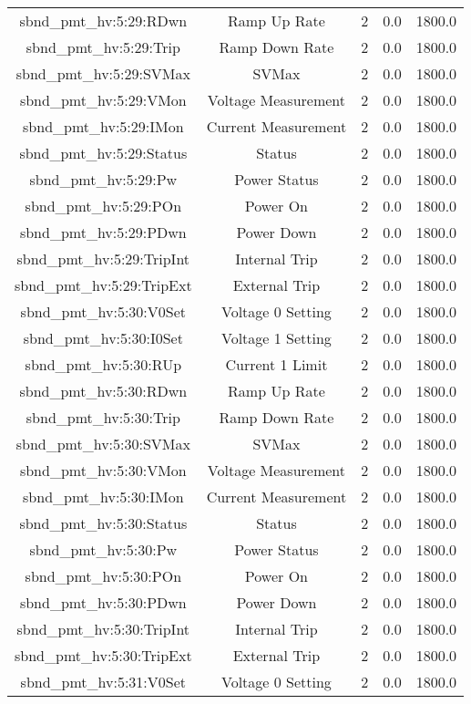 \begin{table}[ptb]
\begin{tabular}{c | c c c c}
sbnd_pmt_hv:5:29:RDwn & Ramp Up Rate & 2 & 0.0 & 1800.0\\ 
sbnd_pmt_hv:5:29:Trip & Ramp Down Rate & 2 & 0.0 & 1800.0\\ 
sbnd_pmt_hv:5:29:SVMax & SVMax & 2 & 0.0 & 1800.0\\ 
sbnd_pmt_hv:5:29:VMon & Voltage Measurement & 2 & 0.0 & 1800.0\\ 
sbnd_pmt_hv:5:29:IMon & Current Measurement & 2 & 0.0 & 1800.0\\ 
sbnd_pmt_hv:5:29:Status & Status & 2 & 0.0 & 1800.0\\ 
sbnd_pmt_hv:5:29:Pw & Power Status & 2 & 0.0 & 1800.0\\ 
sbnd_pmt_hv:5:29:POn & Power On & 2 & 0.0 & 1800.0\\ 
sbnd_pmt_hv:5:29:PDwn & Power Down & 2 & 0.0 & 1800.0\\ 
sbnd_pmt_hv:5:29:TripInt & Internal Trip & 2 & 0.0 & 1800.0\\ 
sbnd_pmt_hv:5:29:TripExt & External Trip & 2 & 0.0 & 1800.0\\ 
sbnd_pmt_hv:5:30:V0Set & Voltage 0 Setting & 2 & 0.0 & 1800.0\\ 
sbnd_pmt_hv:5:30:I0Set & Voltage 1 Setting & 2 & 0.0 & 1800.0\\ 
sbnd_pmt_hv:5:30:RUp & Current 1 Limit & 2 & 0.0 & 1800.0\\ 
sbnd_pmt_hv:5:30:RDwn & Ramp Up Rate & 2 & 0.0 & 1800.0\\ 
sbnd_pmt_hv:5:30:Trip & Ramp Down Rate & 2 & 0.0 & 1800.0\\ 
sbnd_pmt_hv:5:30:SVMax & SVMax & 2 & 0.0 & 1800.0\\ 
sbnd_pmt_hv:5:30:VMon & Voltage Measurement & 2 & 0.0 & 1800.0\\ 
sbnd_pmt_hv:5:30:IMon & Current Measurement & 2 & 0.0 & 1800.0\\ 
sbnd_pmt_hv:5:30:Status & Status & 2 & 0.0 & 1800.0\\ 
sbnd_pmt_hv:5:30:Pw & Power Status & 2 & 0.0 & 1800.0\\ 
sbnd_pmt_hv:5:30:POn & Power On & 2 & 0.0 & 1800.0\\ 
sbnd_pmt_hv:5:30:PDwn & Power Down & 2 & 0.0 & 1800.0\\ 
sbnd_pmt_hv:5:30:TripInt & Internal Trip & 2 & 0.0 & 1800.0\\ 
sbnd_pmt_hv:5:30:TripExt & External Trip & 2 & 0.0 & 1800.0\\ 
sbnd_pmt_hv:5:31:V0Set & Voltage 0 Setting & 2 & 0.0 & 1800.0\\ 

\end{tabular}
\end{table}
